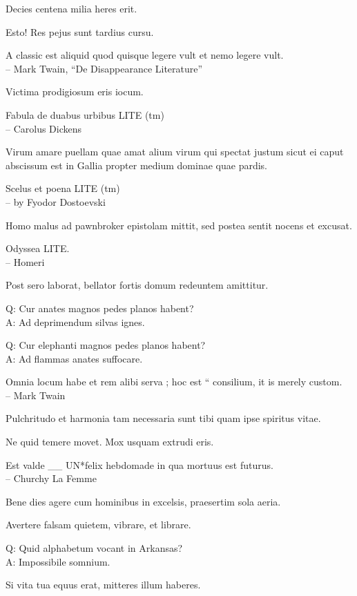 \documentclass[titlepage,12pt]{memoir}
\begin{document}
Decies centena milia heres erit.

Esto! Res pejus sunt tardius cursu.

A classic est aliquid quod quisque legere vult
et nemo legere vult.
\\-- Mark Twain, “De Disappearance Literature”

Victima prodigiosum eris iocum.

Fabula de duabus urbibus LITE (tm)
\\-- Carolus Dickens

Virum amare puellam quae amat alium virum qui spectat justum
sicut ei caput abscissum est in Gallia propter medium
dominae quae pardis.

Scelus et poena LITE (tm)
\\-- by Fyodor Dostoevski

Homo malus ad pawnbroker epistolam mittit, sed postea
sentit nocens et excusat.

Odyssea LITE.
\\-- Homeri

Post sero laborat, bellator fortis domum redeuntem amittitur.

Q: Cur anates magnos pedes planos habent?\\
A: Ad deprimendum silvas ignes.

Q: Cur elephanti magnos pedes planos habent?\\
A: Ad flammas anates suffocare.

 Omnia locum habe et rem alibi serva ; hoc est “
consilium, it is merely custom.
\\-- Mark Twain

 Pulchritudo et harmonia tam necessaria sunt tibi quam ipse spiritus vitae.

Ne quid temere movet. Mox usquam extrudi eris.

Est valde \*\_\_ UN*felix hebdomade in qua mortuus est futurus.
\\-- Churchy La Femme

Bene dies agere cum hominibus in excelsis, praesertim sola aeria.

Avertere falsam quietem, vibrare, et librare.

Q: Quid alphabetum vocant in Arkansas?\\
A: Impossibile somnium.

Si vita tua equus erat, mitteres illum haberes.
\end{document}
